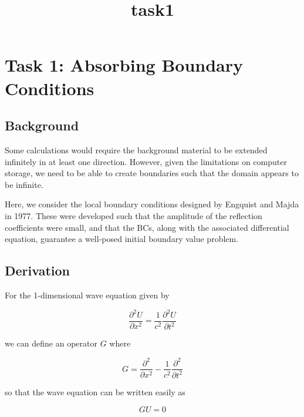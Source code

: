 \documentclass{article}
\title{task1}
\begin{document}
    
    
    \maketitle
    
    

    
    \section{Task 1: Absorbing Boundary
Conditions}\label{task-1-absorbing-boundary-conditions}

\subsection{Background}\label{background}

Some calculations would require the background material to be extended
infinitely in at least one direction. However, given the limitations on
computer storage, we need to be able to create boundaries such that the
domain appears to be infinite.

Here, we consider the local boundary conditions designed by Engquist and
Majda in 1977. These were developed such that the amplitude of the
reflection coefficients were small, and that the BCs, along with the
associated differential equation, guarantee a well-posed initial
boundary value problem.

    \subsection{Derivation}\label{derivation}

For the 1-dimensional wave equation given by

\begin{equation}
\dfrac{\partial^2 U}{\partial x^2} = \dfrac{1}{c^2} \dfrac{\partial^2 U}{\partial t^2} 
\end{equation}

we can define an operator \(G\) where

\begin{equation}
G = \dfrac{\partial^2}{\partial x^2} - \dfrac{1}{c^2} \dfrac{\partial^2}{\partial t^2} 
\end{equation}

so that the wave equation can be written easily as

\begin{equation}
GU = 0
\end{equation}
\end{document}
